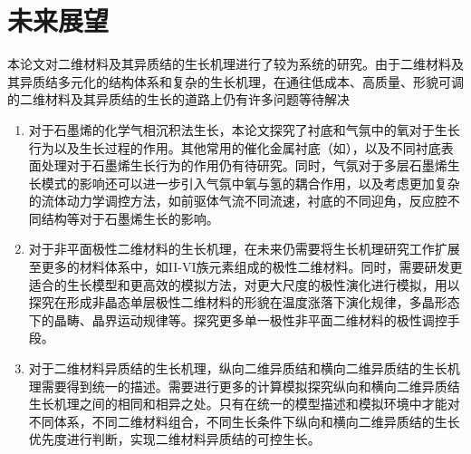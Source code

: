 \section{未来展望}
本论文对二维材料及其异质结的生长机理进行了较为系统的研究。由于二维材料及其异质结多元化的结构体系和复杂的生长机理，在通往低成本、高质量、形貌可调的二维材料及其异质结的生长的道路上仍有许多问题等待解决\chinesecolon
\begin{enumerate}[labelsep=0em,label=（\arabic*）,wide]
    \item 对于石墨烯的化学气相沉积法生长，本论文探究了衬底和气氛中的氧对于生长行为以及生长过程的作用。其他常用的催化金属衬底（如），以及不同衬底表面处理对于石墨烯生长行为的作用仍有待研究。同时，气氛对于多层石墨烯生长模式的影响还可以进一步引入气氛中氧与氢的耦合作用，以及考虑更加复杂的流体动力学调控方法，如前驱体气流不同流速，衬底的不同迎角，反应腔不同结构等对于石墨烯生长的影响。
    \item 对于非平面极性二维材料的生长机理，在未来仍需要将生长机理研究工作扩展至更多的材料体系中，如II-VI族元素组成的极性二维材料。同时，需要研发更适合的生长模型和更高效的模拟方法，对更大尺度的极性演化进行模拟，用以探究在形成非晶态单层极性二维材料的形貌在温度涨落下演化规律，多晶形态下的晶畴、晶界运动规律等。探究更多单一极性非平面二维材料的极性调控手段。
    \item 对于二维材料异质结的生长机理，纵向二维异质结和横向二维异质结的生长机理需要得到统一的描述。需要进行更多的计算模拟探究纵向和横向二维异质结生长机理之间的相同和相异之处。只有在统一的模型描述和模拟环境中才能对不同体系，不同二维材料组合，不同生长条件下纵向和横向二维异质结的生长优先度进行判断，实现二维材料异质结的可控生长。
\end{enumerate}